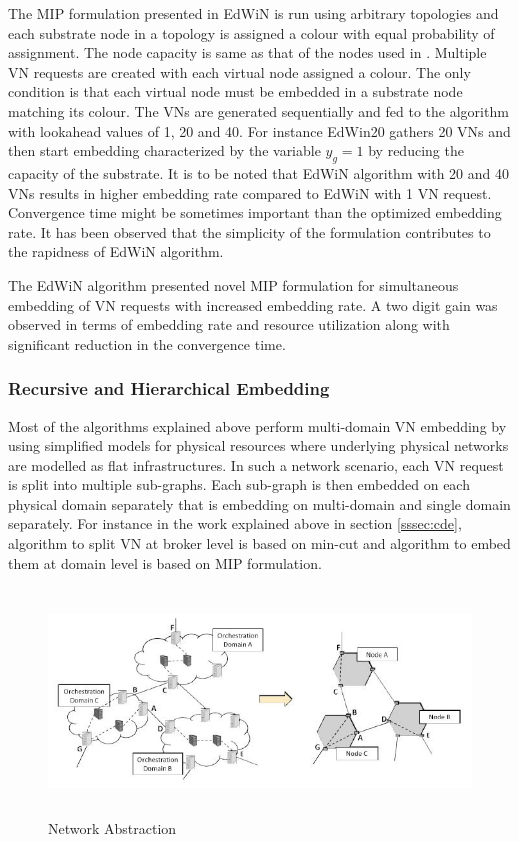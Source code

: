 \documentclass[article,dr=phil,type=msc ,colorback,accentcolor=tud4b]{tudthesis}
\begin{document}
The MIP formulation presented in EdWiN is run using arbitrary topologies and each substrate node in a topology is assigned a colour with equal probability of assignment. The node capacity is same as that of the nodes used in \cite{vn_multiple}. Multiple VN requests are created with each virtual node assigned a colour. The only condition is that each virtual node must be embedded in a substrate node matching its colour. The VNs are generated sequentially and fed to the algorithm with lookahead values of 1, 20 and 40. For instance EdWin20 gathers 20 VNs and then start embedding characterized by the variable $y_{g} = 1$ by reducing the  capacity of the substrate. It is to be noted that EdWiN algorithm with 20 and 40 VNs results in higher embedding rate compared to EdWiN with 1 VN request. Convergence time might be sometimes important than the optimized embedding rate. It has been observed that the simplicity of the formulation contributes to the rapidness of EdWiN algorithm.\newline

The EdWiN algorithm presented novel MIP formulation for simultaneous embedding of VN requests with increased embedding rate. A two digit gain was observed in terms of embedding rate and resource utilization along with significant reduction in the convergence time. 

\newpage
\subsubsection{Recursive and Hierarchical Embedding} \label{md_monitoring}

Most of the algorithms explained above perform multi-domain VN embedding by using simplified models for physical resources where underlying physical networks are modelled as flat infrastructures. In such a network scenario, each VN request is split into multiple sub-graphs. Each sub-graph is then embedded on each physical domain separately that is embedding on multi-domain and single domain separately. For instance in the work explained above in section \ref{sssec:cde}, algorithm to split VN at broker level is based on min-cut and algorithm to embed them at domain level is based on MIP formulation.  
\begin{figure}[h]
	\centering
	\includegraphics[width=12cm, height=6cm]{nw_abst.jpg}
	\caption{Network Abstraction}
	\label{fig: nw_abst}
\end{figure}
\end{document}
